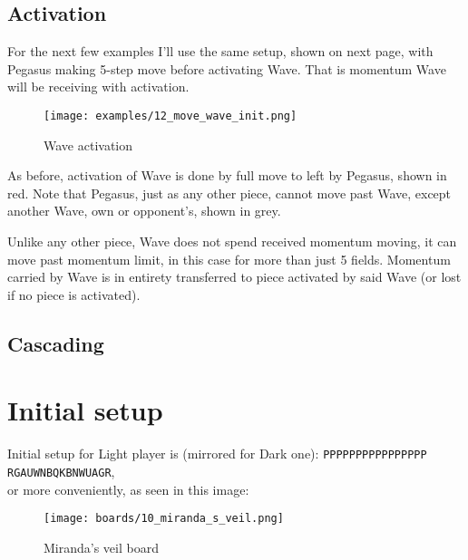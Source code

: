 \subsection*{Activation}

For the next few examples I'll use the same setup, shown on next
page, with Pegasus making 5-step move before activating Wave. That
is momentum Wave will be receiving with activation.

\clearpage %

\noindent
\begin{figure}[h]
\texttt{[image: examples/12\_move\_wave\_init.png]}
\caption{Wave activation}
\label{fig:wave_activation}
\end{figure}

As before, activation of Wave is done by full move to left by Pegasus,
shown in red. Note that Pegasus, just as any other piece, cannot move
past Wave, except another Wave, own or opponent's, shown in grey.

\clearpage %

Unlike any
other piece, Wave does not spend received momentum moving, it can
move past momentum limit, in this case for more than just 5 fields.
Momentum carried by Wave is in entirety transferred to piece
activated by said Wave (or lost if no piece is activated).

\clearpage %

\subsection*{Cascading}

\clearpage %

\section*{Initial setup}

Initial setup for Light player is (mirrored for Dark one):
\texttt{PPPPPPPPPPPPPPPP \\
        RGAUWNBQKBNWUAGR}, \\
or more conveniently, as seen in this image:

\noindent
\begin{figure}[h]
\texttt{[image: boards/10\_miranda\_s\_veil.png]}
\caption{Miranda's veil board}
\label{fig:miranda_s_veil}
\end{figure}

\clearpage %

